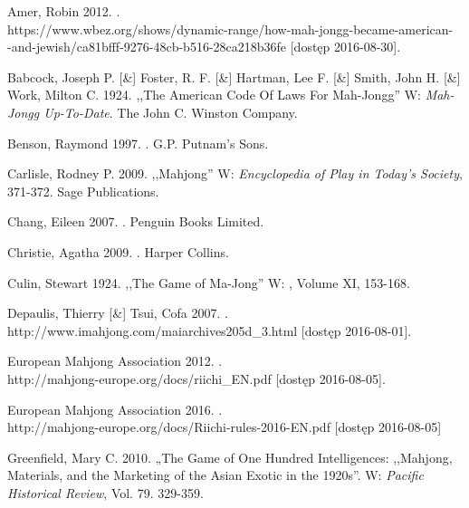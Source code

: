 \onecolumn
\biblio
\setlength{\parindent}{0pt}
\setlength{\parskip}{1ex plus 0.5ex minus 0.2ex}

Amer, Robin 2012. .
\\https://www.wbez.org/shows/dynamic-range/how-mah-jongg-became-american-\\-and-jewish/ca81bfff-9276-48cb-b516-28ca218b36fe
[dostęp 2016-08-30].

Babcock, Joseph P. [\&] Foster, R. F. [\&] Hartman, Lee F. [\&] Smith, John H.
[\&] Work, Milton C. 1924. ,,The American Code Of Laws For Mah-Jongg'' W:
\textit{Mah-Jongg Up-To-Date}. The John C. Winston Company. 

Benson, Raymond 1997. . G.P. Putnam's Sons.

Carlisle, Rodney P. 2009. ,,Mahjong'' W: \textit{Encyclopedia of Play in Today's
Society}, 371-372.
Sage Publications.

Chang, Eileen 2007. . Penguin Books Limited.

Christie, Agatha 2009. . Harper Collins.

Culin, Stewart 1924. ,,The Game of Ma-Jong'' W: , Volume XI, 153-168.

Depaulis, Thierry [\&] Tsui, Cofa 2007. . 
\\http://www.imahjong.com/maiarchives205d\_3.html [dostęp
2016-08-01].

European Mahjong Association 2012. .
\\http://mahjong-europe.org/docs/riichi\_EN.pdf [dostęp 2016-08-05].

European Mahjong Association 2016. .
\\http://mahjong-europe.org/docs/Riichi-rules-2016-EN.pdf [dostęp 2016-08-05]

Greenfield, Mary C. 2010. „The Game of One Hundred Intelligences: ,,Mahjong,
Materials, and the Marketing of the Asian Exotic in the 1920s''. W:
\textit{Pacific Historical Review}, Vol. 79. 329-359.

